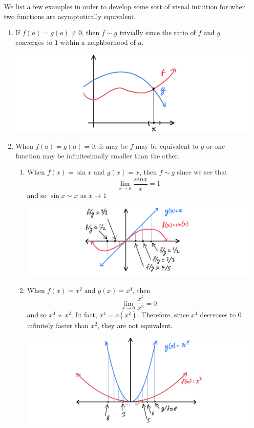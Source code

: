 \documentclass{article}
\theoremstyle{remark}
\theoremstyle{definition}
\begin{document}
We list a few examples in order to develop some sort of visual intuition for when two functions are asymptotically equivalent. 
\begin{enumerate}
    \item If $f(a) = g(a) \neq 0$, then $f \sim g$ trivially since the ratio of $f$ and $g$ converges to $1$ within a neighborhood of $a$. 
    \begin{center}
        \includegraphics[scale=0.3]{img/trivial_case_equal_value.jpg}
    \end{center}
    \item When $f(a) = g(a) = 0$, it may be $f$ may be equivalent to $g$ or one function may be infinitesimally smaller than the other. 
    \begin{enumerate}
        \item When $f(x) = \sin{x}$ and $g(x) = x$, then $f \sim g$ since we see that 
        \[\lim_{x \rightarrow 0} \frac{sin{x}}{x} = 1\]
        and so $\sin{x} \sim x$ as $x \rightarrow 1$
        \begin{center}
            \includegraphics[scale=0.3]{img/x_vs_sin_x.PNG}
        \end{center}
        \item When $f(x) = x^2$ and $g(x) = x^4$, then  \[\lim_{x \rightarrow 0} \frac{x^4}{x^2} = 0\]
        and so $x^4 \not\sim x^2$. In fact, $x^4 = o(x^2)$. Therefore, since $x^4$ decreases to $0$ infinitely faster than $x^2$, they are not equivalent. 
        \begin{center}
            \includegraphics[scale=0.25]{img/x_fourth_vs_x_squared.jpg}

\end{center}
\end{enumerate}
\end{enumerate}
\end{document}
